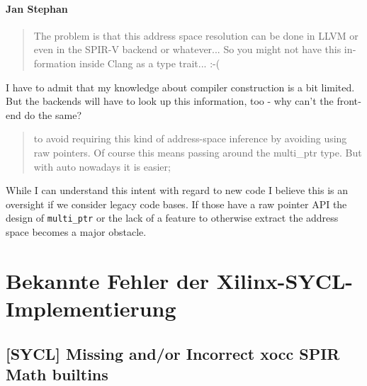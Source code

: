 \begin{otherlanguage}{english}
    \paragraph{Jan Stephan} \begin{quote}
                                The problem is that this address space
                                resolution can be done in LLVM or even in the
                                SPIR-V backend or whatever... So you might not
                                have this information inside Clang as a type
                                trait... :-(
                            \end{quote}
                            I have to admit that my knowledge about compiler
                            construction is a bit limited. But the backends will
                            have to look up this information, too - why can't
                            the frontend do the same?
                            \begin{quote}
                                to avoid requiring this kind of address-space
                                inference by avoiding using raw pointers. Of
                                course this means passing around the
                                multi\_ptr type. But with auto nowadays it is
                                easier;
                            \end{quote}
                            While I can understand this intent with regard to
                            new code I believe this is an oversight if we
                            consider legacy code bases. If those have a raw
                            pointer API the design of \texttt{multi\_ptr} or
                            the lack of a feature to otherwise extract the
                            address space becomes a major obstacle.
\end{otherlanguage}

\section{Bekannte Fehler der Xilinx-SYCL-Implementierung}
\label{anhang:diskussionen:xilinx}

\subsection{[SYCL] Missing and/or Incorrect xocc SPIR Math builtins}
\label{anhang:diskussionen:xilinx:math}

